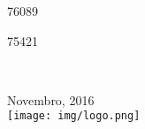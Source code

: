 \begin{titlepage}
\begin{minipage}{0.4\textwidth}
\begin{flushright}
76089

75421
\end{flushright}
\end{minipage}\\[4cm]


\vspace*{3cm}

{\large Novembro, 2016}\\[1cm] %


\texttt{[image: img/logo.png]}\\[1cm]

\end{titlepage}
